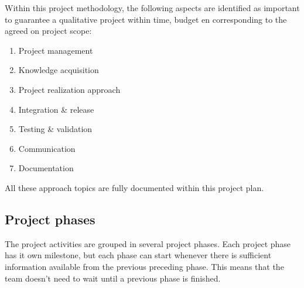 Within this project methodology, the following aspects are identified as important to guarantee a qualitative project within time, budget en corresponding to the agreed on project scope: 
\begin{enumerate}
	\item Project management
	\item Knowledge acquisition 
	\item Project realization approach
	\item Integration \& release
	\item Testing \& validation
	\item Communication
	\item Documentation
\end {enumerate}

All these approach topics are fully documented within this project plan.


\subsection{Project phases}
The project activities are grouped in several project phases. 
Each project phase has it own milestone, but each phase can start whenever there is sufficient information available from the previous preceding phase.
This means that the team doesn't need to wait until a previous phase is finished.

